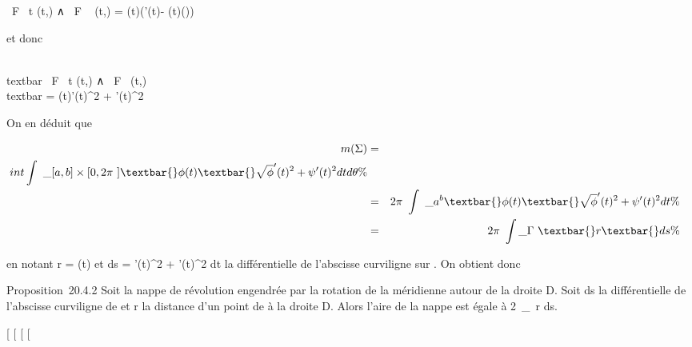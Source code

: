 \documentclass[]{article}
\begin{document}
 \partial~F \over \partial~t (t,\theta) ∧ \partial~F \over \partial~\theta
(t,\theta) = \phi(t)\left (\phi'(t)\veck -
\psi(t)\vecu(\theta)\right )

et donc

\\textbar{} \partial~F \over \partial~t (t,\theta) ∧ \partial~F
\over \partial~\theta (t,\theta)\\textbar{} =
\textbar{}\phi(t)\textbar{}\sqrt\phi'(t)^2  +
\psi'(t)^2

On en déduit que

\begin{align*} m(\Sigma)& =& \\int
 \int ~
\_{[}a,b{]}\times{[}0,2\pi~{]}\textbar{}\phi(t)\textbar{}\sqrt\phi'(t)^2
 + \psi'(t)^2 dt d\theta\%& \\ &
=& 2\pi~\int ~
\_a^b\textbar{}\phi(t)\textbar{}\sqrt\phi'(t)^2
 + \psi'(t)^2 dt \%& \\ &
=& 2\pi~\int  \_\Gamma~\textbar{}r\textbar{} ds
\%& \\ \end{align*}

en notant r = \phi(t) et ds = \sqrt\phi'(t)^2  +
\psi'(t)^2 dt la différentielle de l'abscisse curviligne sur
\Gamma. On obtient donc

Proposition~20.4.2 Soit \Sigma la nappe de révolution engendrée par la
rotation de la méridienne \Gamma autour de la droite D. Soit ds la
différentielle de l'abscisse curviligne de \Gamma et r la distance d'un point
de \Gamma à la droite D. Alors l'aire de la nappe est égale à
2\pi~\int  \_\Gamma~r ds.

{[}
{[}
{[}
{[}
\end{document}
